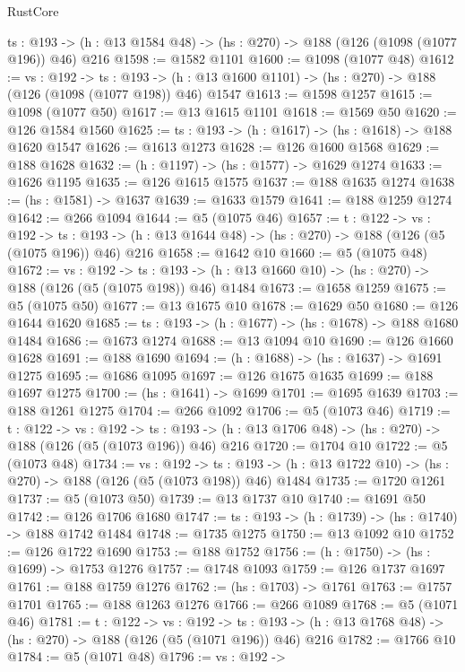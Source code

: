\begin{lexlean}{RustCore}
\begin{coremodule}
  {ts : @193} -> (h : @13 @1584 @48) -> (hs : @270) -> @188 (@126 (@1098 (@1077 @196)) @46) @216
@1598 := @1582 @1101
@1600 := @1098 (@1077 @48)
@1612 := {vs : @192} ->
  {ts : @193} -> (h : @13 @1600 @1101) -> (hs : @270) -> @188 (@126 (@1098 (@1077 @198)) @46) @1547
@1613 := @1598 @1257
@1615 := @1098 (@1077 @50)
@1617 := @13 @1615 @1101
@1618 := @1569 @50
@1620 := @126 @1584 @1560
@1625 := {ts : @193} -> (h : @1617) -> (hs : @1618) -> @188 @1620 @1547
@1626 := @1613 @1273
@1628 := @126 @1600 @1568
@1629 := @188 @1628
@1632 := (h : @1197) -> (hs : @1577) -> @1629 @1274
@1633 := @1626 @1195
@1635 := @126 @1615 @1575
@1637 := @188 @1635 @1274
@1638 := (hs : @1581) -> @1637
@1639 := @1633 @1579
@1641 := @188 @1259 @1274
@1642 := @266 @1094
@1644 := @5 (@1075 @46)
@1657 := {t : @122} ->
  {vs : @192} ->
  {ts : @193} -> (h : @13 @1644 @48) -> (hs : @270) -> @188 (@126 (@5 (@1075 @196)) @46) @216
@1658 := @1642 @10
@1660 := @5 (@1075 @48)
@1672 := {vs : @192} ->
  {ts : @193} -> (h : @13 @1660 @10) -> (hs : @270) -> @188 (@126 (@5 (@1075 @198)) @46) @1484
@1673 := @1658 @1259
@1675 := @5 (@1075 @50)
@1677 := @13 @1675 @10
@1678 := @1629 @50
@1680 := @126 @1644 @1620
@1685 := {ts : @193} -> (h : @1677) -> (hs : @1678) -> @188 @1680 @1484
@1686 := @1673 @1274
@1688 := @13 @1094 @10
@1690 := @126 @1660 @1628
@1691 := @188 @1690
@1694 := (h : @1688) -> (hs : @1637) -> @1691 @1275
@1695 := @1686 @1095
@1697 := @126 @1675 @1635
@1699 := @188 @1697 @1275
@1700 := (hs : @1641) -> @1699
@1701 := @1695 @1639
@1703 := @188 @1261 @1275
@1704 := @266 @1092
@1706 := @5 (@1073 @46)
@1719 := {t : @122} ->
  {vs : @192} ->
  {ts : @193} -> (h : @13 @1706 @48) -> (hs : @270) -> @188 (@126 (@5 (@1073 @196)) @46) @216
@1720 := @1704 @10
@1722 := @5 (@1073 @48)
@1734 := {vs : @192} ->
  {ts : @193} -> (h : @13 @1722 @10) -> (hs : @270) -> @188 (@126 (@5 (@1073 @198)) @46) @1484
@1735 := @1720 @1261
@1737 := @5 (@1073 @50)
@1739 := @13 @1737 @10
@1740 := @1691 @50
@1742 := @126 @1706 @1680
@1747 := {ts : @193} -> (h : @1739) -> (hs : @1740) -> @188 @1742 @1484
@1748 := @1735 @1275
@1750 := @13 @1092 @10
@1752 := @126 @1722 @1690
@1753 := @188 @1752
@1756 := (h : @1750) -> (hs : @1699) -> @1753 @1276
@1757 := @1748 @1093
@1759 := @126 @1737 @1697
@1761 := @188 @1759 @1276
@1762 := (hs : @1703) -> @1761
@1763 := @1757 @1701
@1765 := @188 @1263 @1276
@1766 := @266 @1089
@1768 := @5 (@1071 @46)
@1781 := {t : @122} ->
  {vs : @192} ->
  {ts : @193} -> (h : @13 @1768 @48) -> (hs : @270) -> @188 (@126 (@5 (@1071 @196)) @46) @216
@1782 := @1766 @10
@1784 := @5 (@1071 @48)
@1796 := {vs : @192} ->

\end{coremodule}
\end{lexlean}
